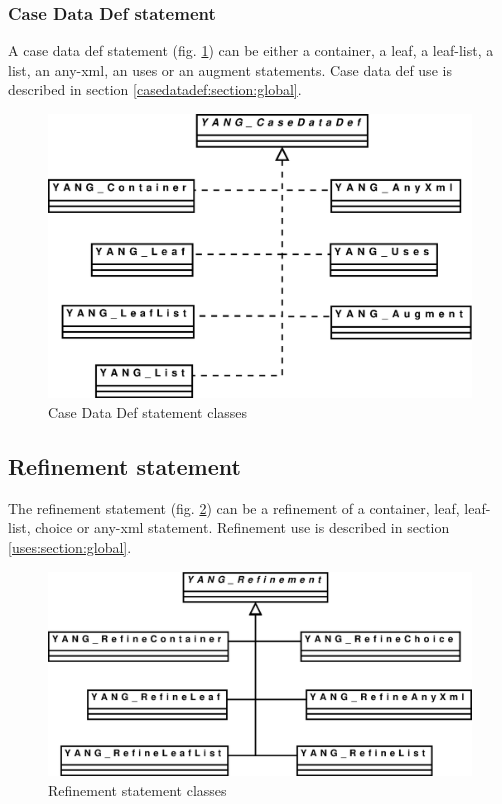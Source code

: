 \documentclass[a4paper]{article}
\begin{document}
\subsubsection{Case Data Def statement}
\label{casedatadef:section:detail}

A case  data def statement  (fig.  \ref{casedatadef}) can be  either a
container, a  leaf, a  leaf-list, a  list, an any-xml,  an uses  or an
augment  statements.   Case  data  def  use is  described  in  section
\ref{casedatadef:section:global}.
\begin{figure}[htbp]
\begin{center}
\includegraphics[scale = .3]{casedatadef.eps}
\end{center}
\caption{Case Data Def  statement classes}
\label{casedatadef}
\end{figure}



\subsection{Refinement statement}
\label{refinement:section:detail}

The refinement statement (fig.   \ref{refinement}) can be a refinement
of    a    container,    leaf,    leaf-list,   choice    or    any-xml
statement.     Refinement    use     is    described     in    section
\ref{uses:section:global}.
\begin{figure}[htbp]
\begin{center}
\includegraphics[scale = .3]{refinement.eps}
\end{center}
\caption{Refinement statement classes}
\label{refinement}
\end{figure}
\end{document}

